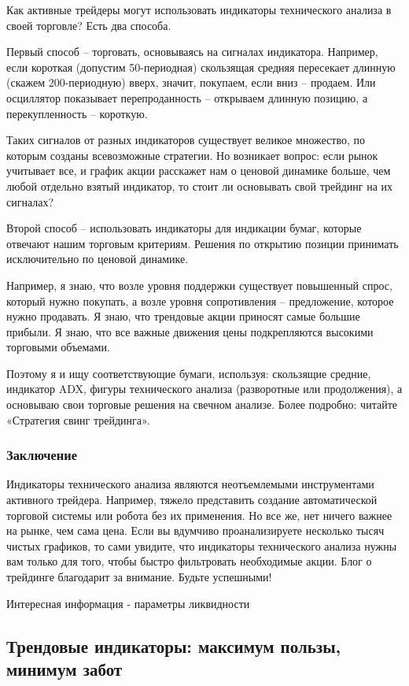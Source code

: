 \documentclass[a5paper]{article}
\begin{document}
Как активные трейдеры могут использовать индикаторы технического анализа в своей торговле? Есть два способа.

Первый способ – торговать, основываясь на сигналах индикатора. Например, если короткая (допустим 50-периодная) скользящая средняя пересекает длинную (скажем 200-периодную) вверх, значит, покупаем, если вниз – продаем. Или осциллятор показывает перепроданность – открываем длинную позицию, а перекупленность – короткую.

Таких сигналов от разных индикаторов существует великое множество, по которым созданы всевозможные стратегии. Но возникает вопрос: если рынок учитывает все, и график акции расскажет нам о ценовой динамике больше, чем любой отдельно взятый индикатор, то стоит ли основывать свой трейдинг на их сигналах?

Второй способ – использовать индикаторы для индикации бумаг, которые отвечают нашим торговым критериям. Решения по открытию позиции принимать исключительно по ценовой динамике.

Например, я знаю, что возле уровня поддержки существует повышенный спрос, который нужно покупать, а возле уровня сопротивления – предложение, которое нужно продавать. Я знаю, что трендовые акции приносят самые большие прибыли. Я знаю, что все важные движения цены подкрепляются высокими торговыми объемами.

Поэтому я и ищу соответствующие бумаги, используя: скользящие средние,
индикатор ADX, фигуры технического анализа (разворотные или
продолжения), а основываю свои торговые решения на свечном
анализе. Более подробно: читайте «Стратегия свинг трейдинга».

\subsubsection{Заключение}

Индикаторы технического анализа являются неотъемлемыми инструментами активного трейдера. Например, тяжело представить создание автоматической торговой системы или робота без их применения. Но все же, нет ничего важнее на рынке, чем сама цена. Если вы вдумчиво проанализируете несколько тысяч чистых графиков, то сами увидите, что индикаторы технического анализа нужны вам только для того, чтобы быстро фильтровать необходимые акции. Блог о трейдинге благодарит за внимание. Будьте успешными!


Интересная информация - параметры ликвидности

\subsection{Трендовые индикаторы: максимум пользы, минимум забот}
\end{document}
